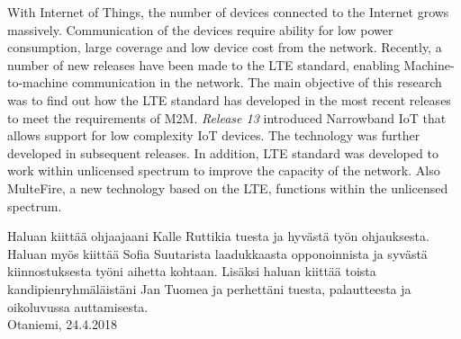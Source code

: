 \documentclass[finnish, 12pt, a4paper, elec, latin1, utf8, online]{aaltothesis}
\date{24.4.2018}
\begin{document}
\makecoverpage{}
\makecopyrightpage{}

\begin{abstractpage}[finnish]
\abstracttext{}
\end{abstractpage}
\newpage

\begin{abstractpage}[english]
With Internet of Things, the number of devices connected to the Internet grows massively. Communication of the devices require ability for low power consumption, large coverage and low device cost from the network. Recently, a number of new releases have been made to the LTE standard, enabling Machine-to-machine communication in the network. The main objective of this research was to find out how the LTE standard has developed in the most recent releases to meet the requirements of M2M. \textit{Release 13} introduced Narrowband IoT that allows support for low complexity IoT devices. The technology was further developed in subsequent releases. In addition, LTE standard was developed to work within unlicensed spectrum to improve the capacity of the network. Also MulteFire, a new technology based on the LTE, functions within the unlicensed spectrum.
\end{abstractpage}

\newpage


Haluan kiittää ohjaajaani Kalle Ruttikia tuesta ja hyvästä työn ohjauksesta. Haluan myös kiittää Sofia Suutarista laadukkaasta opponoinnista ja syvästä kiinnostuksesta työni aihetta kohtaan. Lisäksi haluan kiittää toista kandipienryhmäläistäni Jan Tuomea ja perhettäni tuesta, palautteesta ja oikoluvussa auttamisesta. \\

\vspace{5cm}
Otaniemi, 24.4.2018

\vspace{5mm}
{\hfill \ThesisAuthor \hspace{1cm}}
\newpage


\thesistableofcontents

\end{document}
